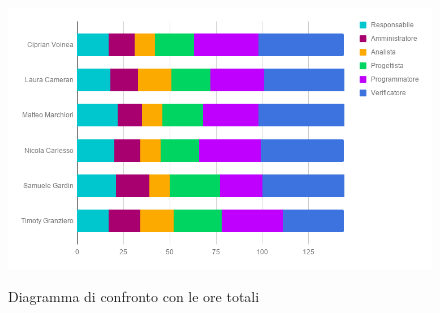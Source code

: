 			\begin{figure}[H]
					\centering
					\includegraphics[scale=0.58]{img/totale2.png}\\
					\caption{Diagramma di confronto con le ore totali}
			\end{figure}
